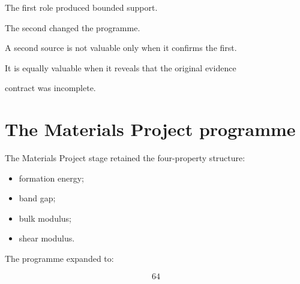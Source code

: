 \documentclass[11pt,a4paper,oneside]{report}
\begin{document}
The first role produced bounded support.



The second changed the programme.





\begin{governingrule}



A second source is not valuable only when it confirms the first.



It is equally valuable when it reveals that the original evidence

contract was incomplete.



\end{governingrule}





\section{The Materials Project programme}



The Materials Project stage retained the four-property structure:



\begin{itemize}



\item

formation energy;



\item

band gap;



\item

bulk modulus;



\item

shear modulus.



\end{itemize}



The programme expanded to:



\begin{equation}
64
\end{equation}
\end{document}
